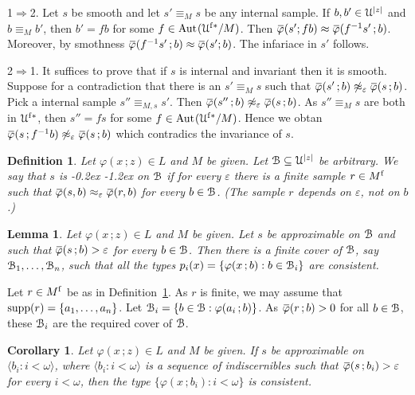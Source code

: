\documentclass[10pt,openany]{article}
\def\supp{\mathop{\rm supp}}
\def\Aut{\textrm{Aut\kern.15ex}}
\newcommand{\sbar}[1]{\mkern 1.8mu\overline{\mkern-1.8mu#1\mkern-1mu}\mkern 1mu}
\def\IMP{\Rightarrow}
\def\U{\EuScript U}
\def\B{\EuScript B}
\def\<{\langle}
\def\>{\rangle}
\def\phi{\varphi}
\def\epsilon{\varepsilon}
\def\ssf#1{\textsf{\small #1}}
\newcounter{thm}[section]
\theoremstyle{mio}
\newtheorem{corollary}[thm]{Corollary}
\newtheorem{lemma}[thm]{Lemma}
\newtheorem{definition}[thm]{Definition}
\theoremstyle{liscio}
\def\QED{\noindent\nolinebreak[4]\hspace{\stretch{1}}\rlap{\ \ $\Box$}\medskip}
\renewenvironment{proof}[1][Proof]%
{\begin{trivlist}\item[\hskip\labelsep {\bf #1}]}
{\QED\end{trivlist}}
\renewcommand*{\emph}[1]{%
   \kern-0.2ex 
   \smash{\tikz[baseline]
   \node[ rectangle, fill=emphcolor, rounded corners, 
          inner xsep=.3ex, inner ysep=.2ex, anchor=base,
          minimum height = 3ex
         ]{#1};
   }
   \kern-1.2ex 
}
\begin{document}
\begin{proof}
  \ssf{1}$\IMP$\ssf{2}.
  Let $s$ be smooth and let $s'\equiv_Ms$ be any internal sample.
  If $b,b'\in\U^{|z|}$ and $b\equiv_Mb'$, then $b'=fb$ for some $f\in\Aut(\U^{\rm f*}/M)$.
  Then $\sbar\phi(s';fb)\approx\sbar\phi(f^{-1}s'\,;b)$.
  Moreover, by smothness $\sbar\phi(f^{-1}s'\,;b)\approx\sbar\phi(s';b)$. The infariace in $s'$ follows.
  
  \ssf{2}$\IMP$\ssf{1}.
  It suffices to prove that if $s$ is internal and invariant then it is smooth.
  Suppose for a contradiction that there is an $s'\equiv_Ms$ such that $\sbar\phi(s'\,;b)\not\approx_\epsilon\sbar\phi(s\,;b)$.
  Pick a internal sample $s''\equiv_{M,s}s'$. 
  Then $\sbar\phi(s''\,;b)\not\approx_\epsilon\sbar\phi(s\,;b)$.
  As $s''\equiv_Ms$ are both in $\U^{\rm f*}$, then $s''=fs$ for some $f\in\Aut(\U^{\rm f*}/M)$.
  Hence we obtan $\sbar\phi(s\,;f^{-1}b)\not\approx_\epsilon\sbar\phi(s\,;b)$ which contradics the invariance of $s$.
\end{proof}


\begin{definition}\label{def_approximable_sample}
  Let $\phi(x\,;z)\in L$ and $M$ be given.
  Let $\B\subseteq\U^{|z|}$ be arbitrary.
  We say that $s$ is \emph{(uniformly) approximable\/} on $\B$ if for every $\epsilon$ there is a finite sample $r\in M^{\rm f}$ such that $\sbar\phi(s,b)\approx_\epsilon\sbar\phi(r,b)$ for every $b\in\B$. (The sample $r$ depends on $\epsilon$, not on $b$.)\QED
\end{definition}

\begin{lemma}\label{lem_cons}
  Let $\phi(x\,;z)\in L$ and $M$ be given.
  Let $s$ be approximable on $\B$ and such that $\sbar\phi(s\,;b)>\epsilon$ for every $b\in\B$. Then there is a finite cover of $\B$, say $\B_1,\dots,\B_n$, such that all the types $p_i(x)=\{\phi(x\,;b):b\in\B_i\}$ are consistent.
\end{lemma}

\begin{proof}
  Let $r\in M^{\rm f}$ be as in Definition~\ref{def_approximable_sample}.
  As $r$ is finite, we may assume that $\supp(r)=\{a_1,\dots,a_n\}$.
  Let $\B_i=\{b\in\B:\phi(a_i\,;b)\}$.
  As $\sbar\phi(r\,;b)>0$ for all $b\in\B$, these $\B_i$ are the required cover of $\B$.
\end{proof}

\begin{corollary}
  Let $\phi(x\,;z)\in L$ and $M$ be given.
  If $s$ be approximable on $\<b_i:i<\omega\>$, where $\<b_i:i<\omega\>$ is a sequence of indiscernibles such that $\sbar\phi(s\,;b_i)>\epsilon$ for every $i<\omega$, then the type $\{\phi(x\,;b_i):i<\omega\}$ is consistent.\QED
\end{corollary}
\end{document}
